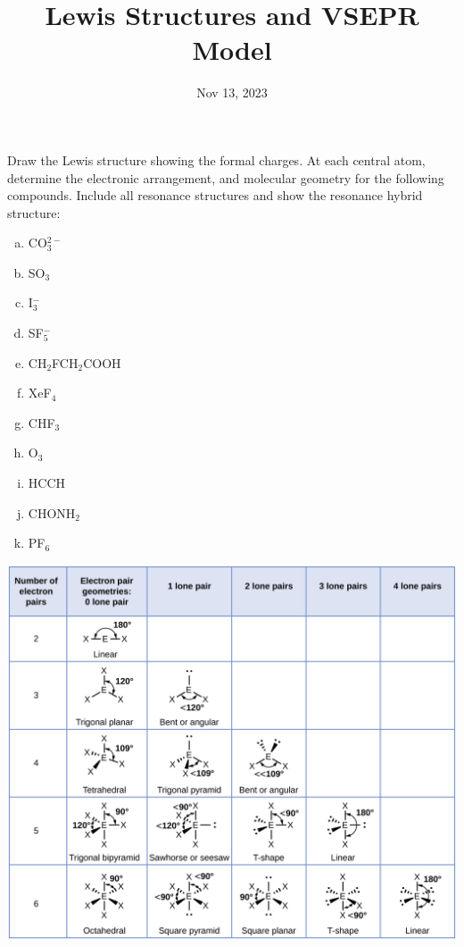 \documentclass[12pt]{article}
\title{\textbf{Lewis Structures and VSEPR Model}}
\date{Nov 13, 2023}
\begin{document}
\maketitle 

Draw the Lewis structure showing the formal charges. At each central atom, determine the
electronic arrangement, and molecular geometry for the following compounds. Include all
resonance structures and show the resonance hybrid structure:

\begin{enumerate}[(a)]
\item CO$_3^{2-}$
  \vspace{1in}
\item SO$_3$
  \vspace{1in}
\item I$_3^-$
  \vspace{1.2in}
\item SF$_5^-$
  \vspace{1.2in}
\item CH$_2$FCH$_2$COOH
  \vspace{1in}
\item XeF$_4$
  \vspace{1in}
\item CHF$_3$
  \vspace{1in}
\item O$_3$
  \vspace{1in}
\item HCCH
  \vspace{1in}
\item CHONH$_2$
  \vspace{1in}
\item PF$_6$
  \vspace{1in}
\end{enumerate}

\newpage

\begin{center}
  \includegraphics[scale=1]{geo_shape}
\end{center}
\end{document}

